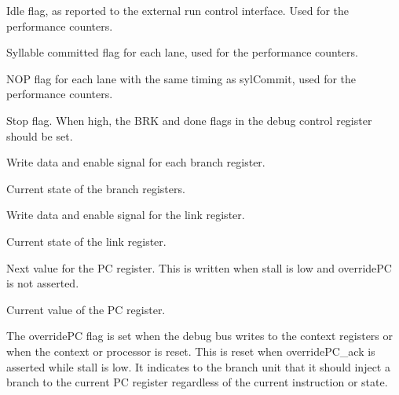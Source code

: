 \ifaceSubGroup{}
Idle flag, as reported to the external run control interface. Used for the 
performance counters.

\ifaceSubGroup{}
Syllable committed flag for each lane, used for the performance counters.
    
\ifaceSubGroup{}
NOP flag for each lane with the same timing as sylCommit, used for the 
performance counters.

\ifaceSubGroup{}
Stop flag. When high, the BRK and done flags in the debug control
register should be set.
    
\ifaceSubGroup{}
Write data and enable signal for each branch register.
    
\ifaceSubGroup{}
Current state of the branch registers.
    
\ifaceSubGroup{}
Write data and enable signal for the link register.
    
\ifaceSubGroup{}
Current state of the link register.

\ifaceSubGroup{}
Next value for the PC register. This is written when stall is low and overridePC 
is not asserted.

\ifaceSubGroup{}
Current value of the PC register.

\ifaceSubGroup{}
The overridePC flag is set when the debug bus writes to the context registers or 
when the context or processor is reset. This is reset when overridePC_ack is 
asserted while stall is low. It indicates to the branch unit that it should 
inject a branch to the current PC register regardless of the current instruction 
or state.

